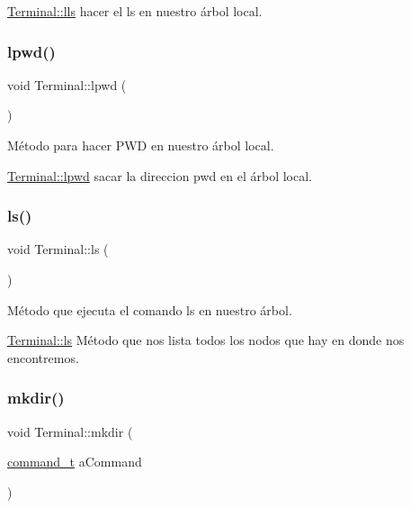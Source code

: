 \hyperlink{classTerminal_a5a72cb107514fb7c5f4d345c3da4a064}{Terminal\+::lls} hacer el ls en nuestro árbol local. \mbox{\label{classTerminal_ac05d53dd80d6dfd7b4e865b1a372969a}} 
\subsubsection{\texorpdfstring{lpwd()}{lpwd()}}
{\footnotesize\ttfamily void Terminal\+::lpwd (\begin{DoxyParamCaption}{ }\end{DoxyParamCaption})}



Método para hacer P\+WD en nuestro árbol local. 

\hyperlink{classTerminal_ac05d53dd80d6dfd7b4e865b1a372969a}{Terminal\+::lpwd} sacar la direccion pwd en el árbol local. \mbox{\label{classTerminal_a96f57c2e3dacbb0062ea098969d74223}} 
\subsubsection{\texorpdfstring{ls()}{ls()}}
{\footnotesize\ttfamily void Terminal\+::ls (\begin{DoxyParamCaption}{ }\end{DoxyParamCaption})}



Método que ejecuta el comando ls en nuestro árbol. 

\hyperlink{classTerminal_a96f57c2e3dacbb0062ea098969d74223}{Terminal\+::ls} Método que nos lista todos los nodos que hay en donde nos encontremos. \mbox{\label{classTerminal_accc2ad8c2abcfc1a01fafb6ad9e3c7ea}} 
\subsubsection{\texorpdfstring{mkdir()}{mkdir()}}
{\footnotesize\ttfamily void Terminal\+::mkdir (\begin{DoxyParamCaption}\item[{\hyperlink{structcommand__t}{command\+\_\+t}}]{a\+Command }\end{DoxyParamCaption})}



